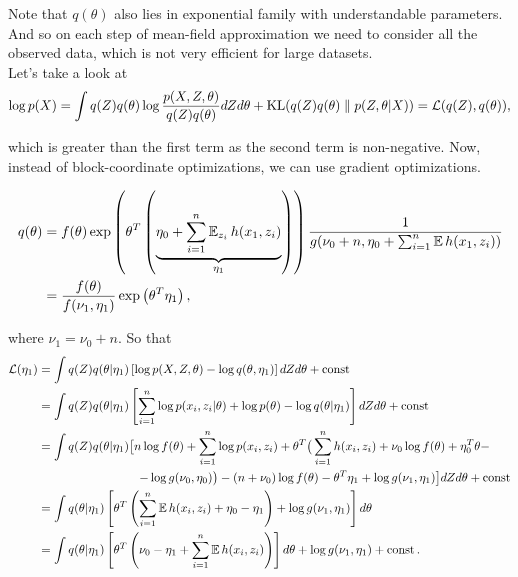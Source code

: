 Note that $q(\theta)$ also lies in exponential family with understandable parameters. And so on each step of mean-field approximation we need to consider all the observed data, which is not very efficient for large datasets. \\

Let's take a look at
\begin{equation*}
    \log p(X) = \int q(Z) q(\theta) \log \frac{p(X, Z, \theta)}{q(Z) q(\theta)} dZ d\theta + \operatorname{KL}(q(Z) q(\theta) \parallel p(Z, \theta | X)) = \operatorname{\mathcal{L}}(q(Z), q(\theta)),
\end{equation*}

which is greater than the first term as the second term is non-negative. Now, instead of block-coordinate optimizations, we can use gradient optimizations.

\begin{equation*}
    \begin{aligned}
        q(\theta) &= f(\theta) \exp \left( \theta^T \left( \underbrace{\eta_0 + \sum_{i = 1}^n \operatorname{\mathbb{E}}_{z_i} h(x_1, z_i)}_{\eta_1}\right) \right) \frac{1}{g(\nu_0 + n, \eta_0 + \sum_{i = 1}^n \operatorname{\mathbb{E}} h(x_1, z_i))} \\
        &= \frac{f(\theta)}{f(\nu_1, \eta_1)} \exp \left( \theta^T \eta_1 \right),
    \end{aligned}
\end{equation*}

where $\nu_1 = \nu_0 + n$. So that
\begin{equation*}
    \begin{aligned}
        \operatorname{\mathcal{L}}(\eta_1) &= \int q(Z) q(\theta | \eta_1) \left[\log p(X, Z, \theta) - \log q(\theta, \eta_1) \right] dZ d\theta + \operatorname{const} \\
        &= \int q(Z) q(\theta | \eta_1) \left[ \sum_{i = 1}^n \log p(x_i, z_i | \theta) + \log p(\theta) - \log q(\theta | \eta_1) \right] dZ d\theta + \operatorname{const} \\
        &= \int q(Z) q(\theta | \eta_1) \big[ n \log f(\theta) + \sum_{i = 1}^n \log p(x_i, z_i) + \theta^T \big( \sum_{i = 1}^n h(x_i, z_i) + \nu_0 \log f(\theta) + \eta_0^T \theta -\\
        &\operatorname{\qquad \qquad \qquad \qquad} - \log g(\nu_0, \eta_0)\big) - (n + \nu_0) \log f(\theta) - \theta^T \eta_1 + \log g(\nu_1, \eta_1)\big] dZ d\theta + \operatorname{const} \\
        &= \int q(\theta | \eta_1) \left[ \theta^T \left( \sum_{i = 1}^n \operatorname{\mathbb{E}} h(x_i, z_i) + \eta_0 - \eta_1\right) + \log g(\nu_1, \eta_1)\right] d \theta \\
        &= \int q(\theta | \eta_1) \left[ \theta^T \left( \nu_0 - \eta_1 + \sum_{i = 1}^n \operatorname{\mathbb{E}} h(x_i, z_i)\right)\right] d \theta + \log g(\nu_1, \eta_1) + \operatorname{const}.
    \end{aligned}
\end{equation*}

